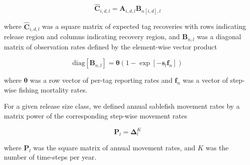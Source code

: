 \documentclass{article}
\begin{document}
\begin{equation}
  \label{eq:expected}
  \boldsymbol{\widehat{C}}_{i,d,l} = \boldsymbol{A}_{i,d,l} \boldsymbol{B}_{n[i,d],l}
\end{equation}

\noindent where $\boldsymbol{\widehat{C}}_{i,d,l}$ was a square matrix of expected tag recoveries with rows indicating release region and columns indicating recovery region, and $\boldsymbol{B}_{n,l}$ was a diagonal matrix of observation rates defined by the element-wise vector product

\begin{equation}
  \label{eq:observation}
  \mathrm{diag} \! \left[\boldsymbol{B}_{n,l}\right] = 
    \boldsymbol{\theta} \left(1 - \exp\!{\left[-\boldsymbol{s}_l \boldsymbol{f}_{n} \right]} \right) 
\end{equation}

\noindent where $\boldsymbol{\theta}$ was a row vector of per-tag reporting rates and $\boldsymbol{f}_n$ was a vector of step-wise fishing mortality rates.

For a given release size class, we defined annual sablefish movement rates by a matrix power of the corresponding step-wise movement rates

\begin{equation}
    \label{eq:movement}
    \boldsymbol{P}_{l} = \boldsymbol{\Delta}_{l}^K
\end{equation}

\noindent where $\boldsymbol{P}_{l}$ was the square matrix of annual movement rates, and $K$ was the number of time-steps per year.



\end{document}

